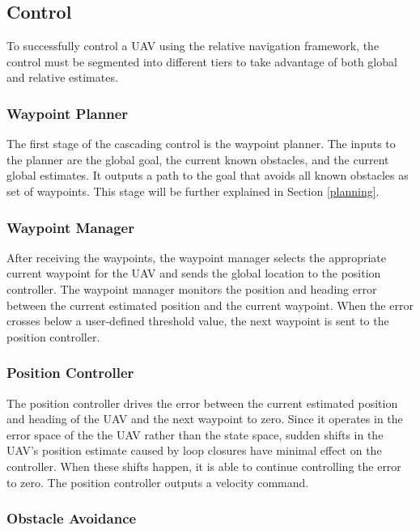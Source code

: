 \documentclass[letterpaper, 10 pt, conference]{ieeeconf}  %
\begin{document}
\subsection{Control}

To successfully control a UAV using the relative navigation framework, the control must be segmented into different tiers to take advantage of both global and relative estimates.

\subsubsection{Waypoint Planner}

The first stage of the cascading control is the waypoint planner. The inputs to the planner are the global goal, the current known obstacles, and the current global estimates. It outputs a path to the goal that avoids all known obstacles as set of waypoints. This stage will be further explained in Section \ref{planning}.

\subsubsection{Waypoint Manager}

After receiving the waypoints, the waypoint manager selects the appropriate current waypoint for the UAV and sends the global location to the position controller. The waypoint manager monitors the position and heading error between the current estimated position and the current waypoint. When the error crosses below a user-defined threshold value, the next waypoint is sent to the position controller.

\subsubsection{Position Controller}

The position controller drives the error between the current estimated position and heading of the UAV and the next waypoint to zero. Since it operates in the error space of the the UAV rather than the state space, sudden shifts in the UAV's position estimate caused by loop closures have minimal effect on the controller. When these shifts happen, it is able to continue controlling the error to zero. The position controller outputs a velocity command.

\subsubsection{Obstacle Avoidance} \label{obs_avoid}
\end{document}
